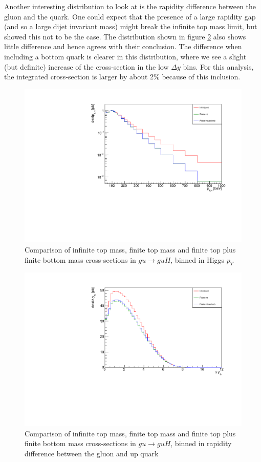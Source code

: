Another interesting distribution to look at is the rapidity difference between the gluon and the quark. One could expect that the presence of a large rapidity gap (and so a large dijet invariant mass) might break the infinite top mass limit, but \cite{Duca2003} showed this not to be the case. The distribution shown in figure \ref{fig:higgs_ydiff} also shows little difference and hence agrees with their conclusion. The difference when including a bottom quark is clearer in this distribution, where we see a slight (but definite) increase of the cross-section in the low $\Delta y$ bins. For this analysis, the integrated cross-section is larger by about 2\% because of this inclusion. 

\begin{figure}[t]
\centering
\includegraphics[scale=0.75]{Images/ptH_gu.pdf}
\caption{Comparison of infinite top mass, finite top mass and finite top plus finite bottom mass cross-sections in $gu \to guH$, binned in Higgs $p_T$ }
\label{fig:higgs_pt}
\end{figure}

\begin{figure}[t]
\centering
\includegraphics[scale=0.75]{Images/ydiff_gu.pdf}
\caption{Comparison of infinite top mass, finite top mass and finite top plus finite bottom mass cross-sections in $gu \to guH$, binned in rapidity difference between the gluon and up quark}
\label{fig:higgs_ydiff}
\end{figure}

